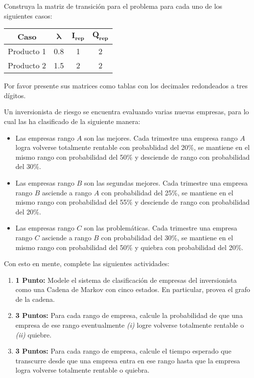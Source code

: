 \documentclass[ a4paper, twoside, 11pt]{article}
\begin{document}
\begin{problem}
Construya la matriz de transici\'on para el problema para cada uno de los siguientes casos: 
\begin{table}[htb]
\centering
\begin{tabular}{|c|c|c|c|}
\hline
\textbf{Caso}           & $\bm{\lambda}$ & $\bm{I_{rep}}$ & $\bm{Q_{rep}}$ \\ \hline
Producto 1 & 0.8 & 1  & 2                  \\ \hline
Producto 2 & 1.5 & 2  & 2                  \\ \hline
\end{tabular}
\end{table}

Por favor presente sus matrices como tablas con los decimales redondeados a tres d\'igitos. 

\end{problem}
\vspace{\baselineskip}

\begin{problem}
Un inversionista de riesgo se encuentra evaluando varias nuevas empresas, para lo cual las ha clasificado de la siguiente manera: 
\begin{itemize}
\item Las empresas rango $A$ son las mejores. Cada trimestre una empresa rango $A$ logra volverse totalmente rentable con probablidad del 20\%, se mantiene en el mismo rango con probabilidad del 50\% y desciende de rango con probabilidad del 30\%. 
\item Las empresas rango $B$ son las segundas mejores. Cada trimestre una empresa rango $B$ \linebreak asciende a rango $A$ con probabilidad del 25\%, se mantiene en el mismo rango con probabilidad del 55\% y desciende de rango con probabilidad del 20\%. 
\item Las empresas rango $C$ son las problem\'aticas. Cada trimestre una empresa rango $C$ asciende a rango $B$ con probabilidad del 30\%, se mantiene en el mismo rango con probabilidad del 50\% y quiebra con probabilidad del 20\%. 
\end{itemize}

Con esto en mente, complete las siguientes actividades: 
\begin{enumerate}[label=\textbf{\alph*)}]
\item \textbf{1 Punto:} Modele el sistema de clasificaci\'on de empresas del inversionista como una Cadena de Markov con cinco estados. En particular, provea el grafo de la cadena. 
\item \textbf{3 Puntos:} Para cada rango de empresa, calcule la probabilidad de que una empresa de ese rango eventualmente \textit{(i)} logre volverse totalmente rentable o \textit{(ii)} quiebre. 
\item \textbf{3 Puntos:} Para cada rango de empresa, calcule el tiempo esperado que transcurre desde que una empresa entra en ese rango hasta que la empresa logra volverse totalmente rentable o quiebra. 
\end{enumerate}

\end{problem}
\vspace{\baselineskip}
\end{document}
